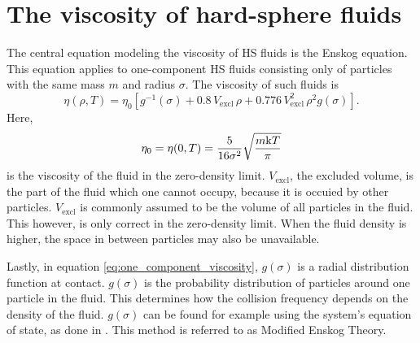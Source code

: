 \section{The viscosity of hard-sphere fluids}
The central equation modeling the viscosity of HS fluids is the Enskog equation. 
This equation applies to one-component HS fluids consisting only of particles 
with the same mass $m$ and radius $\sigma$.
The viscosity of such fluids is \cite{ref:pippo:composition_dependence}
\begin{equation}
    \label{eq:one_component_viscosity}
    \eta(\rho,T) 
        = \eta_0 \left[g^{-1}(\sigma) 
        + 0.8   \, V_{\text{excl}}      \,\rho 
        + 0.776 \, V_{\text{excl}}^2    \,\rho^2 g(\sigma) 
        \right].
\end{equation}
Here, 
\begin{equation}
    \eta_0 = \eta(0, T) = 
    \frac{5}{16\sigma^2} \sqrt{\frac{m \mathrm{k} T}{\pi}}
\end{equation}
is the viscosity of the fluid in the zero-density limit.
$V_{\text{excl}}$, the excluded volume, 
is the part of the fluid which one cannot occupy,
because it is occuied by other particles.
$V_{\text{excl}}$ is commonly assumed to be 
the volume of all particles in the fluid.
This however, is only correct in the zero-density limit. 
When the fluid density is higher, 
the space in between particles may also be unavailable.

Lastly, in equation \eqref{eq:one_component_viscosity}, 
$g(\sigma)$ is a radial distribution function at contact.
$g(\sigma)$ is the probability distribution of particles around one particle in the fluid.
This determines how the collision frequency depends on the density of the fluid.
$g(\sigma)$ can be found for example using the system's equation of state, 
as done in \cite{ref:pippo:composition_dependence}.
This method is referred to as Modified Enskog Theory.

